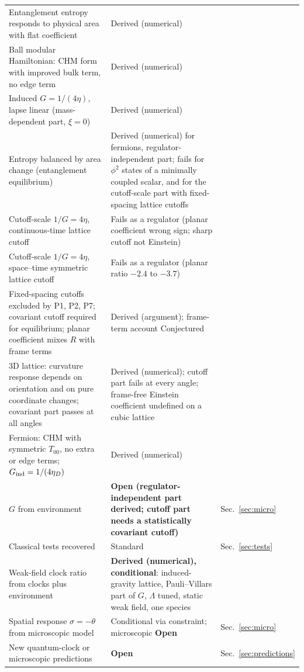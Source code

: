 \documentclass[11pt]{article}
\newcommand{\thP}{\theta}             %
\newcommand{\sgP}{\sigma}             %
\theoremstyle{plain}
\theoremstyle{definition}
\theoremstyle{remark}
\begin{document}
\begin{longtable}{@{}>{\raggedright\arraybackslash}p{}>{\raggedright\arraybackslash}p{}>{\raggedright\arraybackslash}p{}@{}}
Entanglement entropy responds to physical area with flat coefficient & Derived (numerical) & \cite{JordanNote4} \\
Ball modular Hamiltonian: CHM form with improved bulk term, no edge term & Derived (numerical) & \cite{JordanNote4,JordanNote5} \\
Induced $G=1/(4\eta)$, lapse linear (mass-dependent part, $\xi=0$) & Derived (numerical) & \cite{JordanNote5} \\
Entropy balanced by area change (entanglement equilibrium) & Derived (numerical) for fermions, regulator-independent part; fails for $\phi^2$ states of a minimally coupled scalar, and for the cutoff-scale part with fixed-spacing lattice cutoffs & \cite{Jacobson2016,JordanNote5,JordanNote6,JordanNote7,JordanNote8} \\
Cutoff-scale $1/G=4\eta$, continuous-time lattice cutoff & Fails as a regulator (planar coefficient wrong sign; sharp cutoff not Einstein) & \cite{JordanNote7} \\
Cutoff-scale $1/G=4\eta$, space--time symmetric lattice cutoff & Fails as a regulator (planar ratio $-2.4$ to $-3.7$) & \cite{JordanNote8} \\
Fixed-spacing cutoffs excluded by P1, P2, P7; covariant cutoff required for equilibrium; planar coefficient mixes $R$ with frame terms & Derived (argument); frame-term account Conjectured & \cite{JordanNote9} \\
3D lattice: curvature response depends on orientation and on pure coordinate changes; covariant part passes at all angles & Derived (numerical); cutoff part fails at every angle; frame-free Einstein coefficient undefined on a cubic lattice & \cite{JordanNote10} \\
Fermion: CHM with symmetric $T_{00}$, no extra or edge terms; $G_{\rm ind}=1/(4\eta_D)$ & Derived (numerical) & \cite{JordanNote6} \\
$G$ from environment & \textbf{Open (regulator-independent part derived; cutoff part needs a statistically covariant cutoff)} & Sec.~\ref{sec:micro} \\
Classical tests recovered & Standard & Sec.~\ref{sec:tests} \\
Weak-field clock ratio from clocks plus environment & \textbf{Derived (numerical), conditional}: induced-gravity lattice, Pauli--Villars part of $G$, $\Lambda$ tuned, static weak field, one species & \cite{JordanNote12} \\
Spatial response $\sgP=-\thP$ from microscopic model & Conditional via constraint; microscopic \textbf{Open} & Sec.~\ref{sec:micro} \\
New quantum-clock or microscopic predictions & \textbf{Open} & Sec.~\ref{sec:predictions} \\
\bottomrule
\end{longtable}
\end{document}
